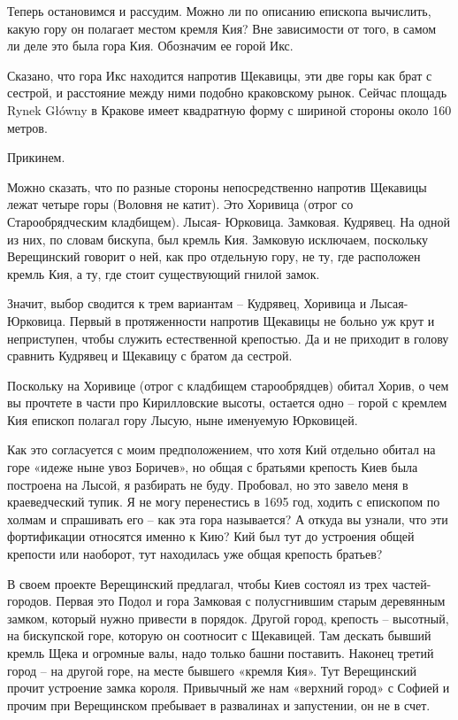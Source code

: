 Теперь остановимся и рассудим. Можно ли по описанию епископа вычислить, какую гору он полагает местом кремля Кия? Вне зависимости от того, в самом ли деле это была гора Кия. Обозначим ее горой Икс.

Сказано, что гора Икс находится напротив Щекавицы, эти две горы как брат с сестрой, и расстояние между ними подобно краковскому рынок. Сейчас площадь Rynek Główny в Кракове имеет квадратную форму с шириной стороны около 160 метров.

Прикинем.

Можно сказать, что по разные стороны непосредственно напротив Щекавицы лежат четыре горы (Воловня не катит). Это Хоривица (отрог со Старообрядческим кладбищем). Лысая- Юрковица. Замковая. Кудрявец. На одной из них, по словам бискупа, был кремль Кия. Замковую исключаем, поскольку Верещинский говорит о ней, как про отдельную гору, не ту, где расположен кремль Кия, а ту, где стоит существующий гнилой замок.

Значит, выбор сводится к трем вариантам – Кудрявец, Хоривица и Лысая-Юрковица. Первый в протяженности напротив Щекавицы не больно уж крут и неприступен, чтобы служить естественной крепостью. Да и не приходит в голову сравнить Кудрявец и Щекавицу с братом да сестрой.

Поскольку на Хоривице (отрог с кладбищем старообрядцев) обитал Хорив, о чем вы прочтете в части про Кирилловские высоты, остается одно – горой с кремлем Кия епископ полагал гору Лысую, ныне именуемую Юрковицей.

Как это согласуется с моим предположением, что хотя Кий отдельно обитал на горе «идеже ныне увоз Боричев», но общая с братьями крепость Киев была построена на Лысой, я разбирать не буду. Пробовал, но это завело меня в краеведческий тупик. Я не могу перенестись в 1695 год, ходить с епископом по холмам и спрашивать его – как эта гора называется? А откуда вы узнали, что эти фортификации относятся именно к Кию? Кий был тут до устроения общей крепости или наоборот, тут находилась уже общая крепость братьев?

В своем проекте Верещинский предлагал, чтобы Киев состоял из трех частей-городов. Первая это Подол и гора Замковая с полусгнившим старым деревянным замком, который нужно привести в порядок. Другой город, крепость – высотный, на бискупской горе, которую он соотносит с Щекавицей. Там дескать бывший кремль Щека и огромные валы, надо только башни поставить. Наконец третий город – на другой горе, на месте бывшего «кремля Кия». Тут Верещинский прочит устроение замка короля. Привычный же нам «верхний город» с Софией и прочим при Верещинском пребывает в развалинах и запустении, он не в счет.

